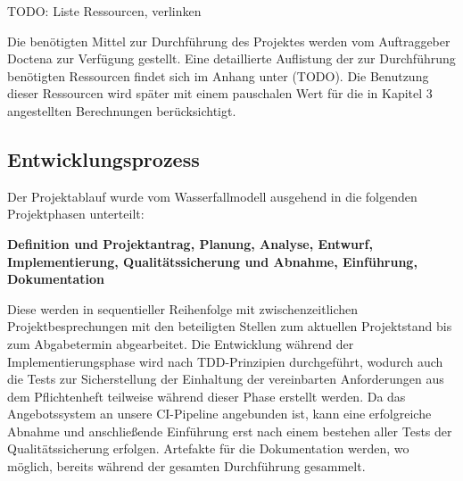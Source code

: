 TODO: Liste Ressourcen, verlinken

Die benötigten Mittel zur Durchführung des Projektes werden vom Auftraggeber Doctena zur Verfügung gestellt. Eine detaillierte Auflistung der zur Durchführung benötigten Ressourcen findet sich im Anhang unter (TODO). Die Benutzung dieser Ressourcen wird später mit einem pauschalen Wert für die in Kapitel 3 angestellten Berechnungen berücksichtigt.

\subsection{Entwicklungsprozess}
\label{sec:Entwicklungsprozess}
Der Projektablauf wurde vom Wasserfallmodell ausgehend in die folgenden Projektphasen unterteilt:

\textbf{Definition und Projektantrag, Planung, Analyse, Entwurf, Implementierung, Qualitätssicherung und Abnahme, Einführung, Dokumentation}

Diese werden in sequentieller Reihenfolge mit zwischenzeitlichen Projektbesprechungen mit den beteiligten Stellen zum aktuellen Projektstand bis zum Abgabetermin abgearbeitet. Die Entwicklung während der Implementierungsphase wird nach TDD-Prinzipien durchgeführt, wodurch auch die Tests zur Sicherstellung der Einhaltung der vereinbarten Anforderungen aus dem Pflichtenheft teilweise während dieser Phase erstellt werden. Da das Angebotssystem an unsere CI-Pipeline angebunden ist, kann eine erfolgreiche Abnahme und anschließende Einführung erst nach einem bestehen aller Tests der Qualitätssicherung erfolgen. Artefakte für die Dokumentation werden, wo möglich, bereits während der gesamten Durchführung gesammelt.
